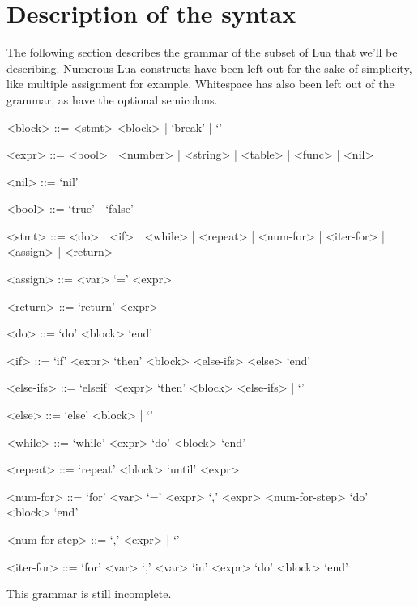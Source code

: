 \documentclass{article}
\begin{document}
\section{Description of the syntax}

The following section describes the grammar of the subset of Lua that we'll be
describing. Numerous Lua constructs have been left out for the sake of
simplicity, like multiple assignment for example. Whitespace has also been left
out of the grammar, as have the optional semicolons.

\newpage

\begin{grammar}
	<block> ::= <stmt> <block> | `break' | `'
	
	<expr> ::= <bool> | <number> | <string> | <table> | <func> | <nil>
	
	<nil> ::= `nil'
	
	<bool> ::= `true' | `false'
	
	<stmt> ::= <do> | <if> | <while> | <repeat> | <num-for> | <iter-for> | <assign> | <return>
	
	<assign> ::= <var> `=' <expr>
	
	<return> ::= `return' <expr>
	
	<do> ::= `do' <block> `end'
	
	<if> ::= `if' <expr> `then' <block> <else-ifs> <else> `end'
	
	<else-ifs> ::= `elseif' <expr> `then' <block> <else-ifs> | `'
	
	<else> ::= `else' <block> | `'
	
	<while> ::= `while' <expr> `do' <block> `end'
	
	<repeat> ::= `repeat' <block> `until' <expr>
	
	<num-for> ::= `for' <var> `=' <expr> `,' <expr> <num-for-step> `do' <block> `end'
	
	<num-for-step> ::= `,' <expr> | `'
	
	<iter-for> ::= `for' <var> `,' <var> `in' <expr> `do' <block> `end'
\end{grammar}

This grammar is still incomplete.

\end{document}
